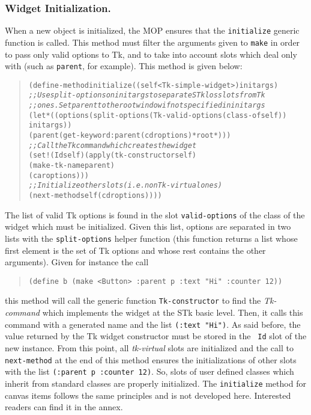 {\subsubsection{Widget Initialization.} 

\label{widget-init}When a new object is initialized, the MOP ensures that the 
{\tt initialize} generic function is called. This method must filter
the arguments given to {\tt make} in order to pass only
valid options to Tk, and to take into account slots which deal only with
{\stklos} (such as {\tt parent}, for example). This method is given below: 
\begin{quote}\figsize
\begin{alltt}
(define-method initialize ((self <Tk-simple-widget>) initargs)
  {\em ;; Use split-options on initargs to separate STklos slots from Tk}
  {\em ;; ones. Set parent to the root window if not specified in initargs}
  (let* ((options (split-options (Tk-valid-options (class-of self))
                                 initargs))
         (parent  (get-keyword :parent (cdr options) *root*)))
    {\em ;; Call the Tk command which creates the widget}
    (set! (Id self) (apply (tk-constructor self)
                           (make-tk-name parent) 
                           (car options)))
    {\em ;; Initialize other slots (i.e. non Tk-virtual ones)}
    (next-method self (cdr options))))
\end{alltt}
\end{quote}

\noindent
The list of valid Tk options is found in the slot {\tt valid-options} of the
class of the widget which must be initialized. Given this list,
options are separated in two lists with the {\tt split-options} helper
function (this function returns a list whose first element is the set 
of Tk options and whose rest contains the other arguments). Given for
instance the call 
\begin{quote}\figsize
\begin{verbatim}
(define b (make <Button> :parent p :text "Hi" :counter 12))
\end{verbatim}
\end{quote}
this method will call the generic function {\tt Tk-constructor} to
find the {\em Tk-command} which implements the widget at the STk basic
level. Then, it calls this command with a
generated name and the list {\tt (:text "Hi")}.  As said before, the
value returned by the Tk widget constructor must be stored in the {\tt
Id} slot of the new instance.  From this point, all {\em tk-virtual}
slots are initialized and the call to {\tt next-method} at the end of
this method ensures the initializations of other slots with the list
{\tt (:parent p :counter 12)}. So, slots of user defined classes which
inherit from standard {\stklos} classes are properly initialized. The
{\tt initialize} method for canvas items follows the same principles
and is not developed here. Interested readers can find it in the
annex.

}
